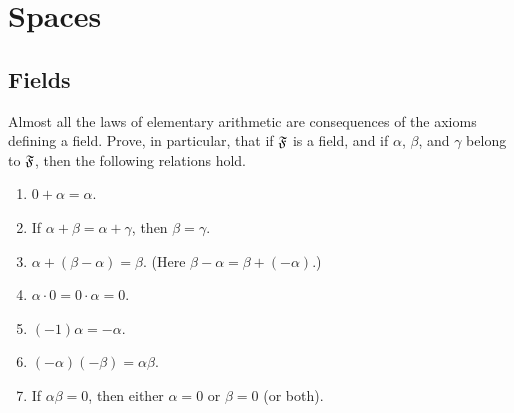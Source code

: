 \chapter{Spaces}

\section{Fields}

 Almost all the laws of elementary arithmetic are
consequences of the axioms defining a field. Prove, in particular,
that if $\mathfrak{F}$ is a field, and if $\alpha$, $\beta$, and $\gamma$ belong
to $\mathfrak{F}$, then the following relations hold.
\begin{enumerate}
\item $0 + \alpha = \alpha$.
\item If $\alpha + \beta = \alpha + \gamma$, then $\beta = \gamma$.
\item $\alpha + (\beta - \alpha) = \beta$. (Here
  $\beta - \alpha = \beta + (-\alpha)$.)
\item $\alpha\cdot0 = 0\cdot\alpha = 0$.
\item $(-1)\alpha = -\alpha$.
\item $(-\alpha)(-\beta) = \alpha\beta$.
\item If $\alpha\beta = 0$, then either $\alpha = 0$ or $\beta = 0$
  (or both).
\end{enumerate}
